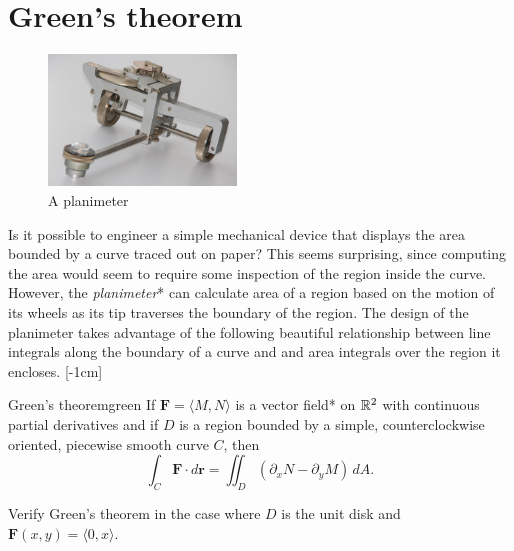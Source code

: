 \documentclass[svgnames]{report}
\begin{document}
\section{Green's theorem}


\begin{figure}
  \includegraphics[width=5cm]{figures/planimeter}
  \caption{A planimeter \label{fig:planimeter}}
\end{figure}

Is it possible to engineer a simple mechanical device that displays
the area bounded by a curve traced out on paper? This seems
surprising, since computing the area would seem to require some
inspection of the region inside the curve. However, the
\textit{planimeter}* can calculate area of a region based on the
motion of its wheels as its tip traverses the boundary of the region. The
design of the planimeter takes advantage of the following beautiful
relationship between line integrals along the boundary of a curve and
and area integrals over the region it encloses. [-1cm]

\begin{theo}{Green's theorem}{green}
  If $\mathbf{F} = \langle M, N\rangle$ is a vector field* on $\mathbb{R}^2$
  with continuous partial derivatives and if $D$ is a region bounded by a
  simple, counterclockwise oriented, piecewise smooth curve $C$, then
  \[
    \int_C \mathbf{F} \cdot d\mathbf{r} = \iint_D \left(\partial_x N -
      \partial_y M \right) \, dA. 
  \]
\end{theo}

\begin{example}{}{}
  Verify Green's theorem in the case where $D$ is the unit disk and
  $\mathbf{F}(x,y)= \langle 0, x \rangle$. 
\end{example}
\end{document}
